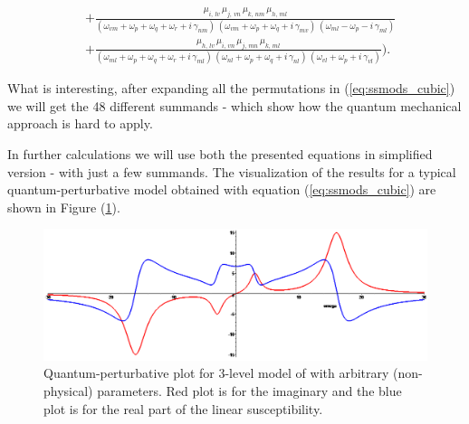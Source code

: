 \documentclass[12pt,twoside,a4paper]{article}
\numberwithin{equation}{subsection}
\numberwithin{figure}{subsection}
\begin{document}
\begin{equation}
\begin{split}
 \\ & + \frac {{\mu_{i,\,lv}}\,{\mu_{j,\,vn}}\,{\mu_{k,\,nm}}\,{\mu_{h,\,ml}}}
              {({\omega_{vm}} + {\omega_{p}} + {\omega_{q}} + {\omega_{r}} + i\,{\gamma_{nm}}) \,
               ({\omega_{vm}} + {\omega_{p}} + {\omega_{q}} + i\,{\gamma_{mv}}) \,
               ({\omega_{ml}} - {\omega_{p}} - i\,{\gamma_{ml}})} 
 \\ & + \frac {{\mu_{h, \,lv}}\,{\mu_{i,\,vn}}\,{\mu_{j,\,mn}}\,{\mu_{k,\,ml}}}
              {({\omega_{ml}} + {\omega_{p}} + {\omega_{q}} + {\omega_{r}} + i\,{\gamma_{ml}}) \,
               ({\omega_{nl}} + {\omega_{p}} + {\omega_{q}} + i\,{\gamma_{nl}}) \,
               ({\omega_{vl}} + {\omega_{p}} + i\,{\gamma_{vl}})}).
  \end{split}
\end{equation}


What is interesting, after expanding all the permutations in (\ref{eq:ssmods_cubic}) we will get the 48 different
summands - which show how the quantum mechanical approach is hard to apply.

In further calculations we will use both the presented equations in simplified version - with just a few summands. The visualization of the
results for a typical quantum-perturbative model obtained with equation (\ref{eq:ssmods_cubic}) are shown in Figure (\ref{fig:qp_plot}).

\begin{figure}
	\includegraphics[width=150mm]{img/qp_plot.png}
	\caption{Quantum-perturbative plot for 3-level model of with arbitrary (non-physical) parameters. Red plot is for the imaginary and the
	blue plot is for the real part of the linear susceptibility. \label{fig:qp_plot}}
\end{figure}
\end{document}
